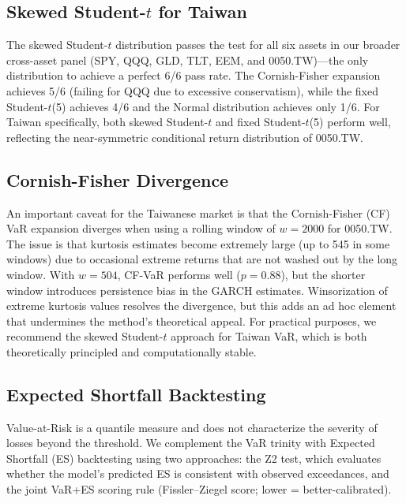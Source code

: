\subsection{Skewed Student-$t$ for Taiwan}

The skewed Student-$t$ distribution passes the \citet{kupiec1995} test for all six assets in our broader cross-asset panel (SPY, QQQ, GLD, TLT, EEM, and 0050.TW)---the only distribution to achieve a perfect 6/6 pass rate. The Cornish-Fisher expansion achieves 5/6 (failing for QQQ due to excessive conservatism), while the fixed Student-$t$(5) achieves 4/6 and the Normal distribution achieves only 1/6. For Taiwan specifically, both skewed Student-$t$ and fixed Student-$t$(5) perform well, reflecting the near-symmetric conditional return distribution of 0050.TW.

\subsection{Cornish-Fisher Divergence}
\label{sec:cf}

An important caveat for the Taiwanese market is that the Cornish-Fisher (CF) VaR expansion diverges when using a rolling window of $w = 2000$ for 0050.TW. The issue is that kurtosis estimates become extremely large (up to 545 in some windows) due to occasional extreme returns that are not washed out by the long window. With $w = 504$, CF-VaR performs well ($p = 0.88$), but the shorter window introduces persistence bias in the GARCH estimates. Winsorization of extreme kurtosis values resolves the divergence, but this adds an ad hoc element that undermines the method's theoretical appeal. For practical purposes, we recommend the skewed Student-$t$ approach for Taiwan VaR, which is both theoretically principled and computationally stable.


\subsection{Expected Shortfall Backtesting}
\label{sec:es}

Value-at-Risk is a quantile measure and does not characterize the severity of losses beyond the threshold. We complement the VaR trinity with Expected Shortfall (ES) backtesting using two approaches: the \citet{acerbi2014} Z2 test, which evaluates whether the model's predicted ES is consistent with observed exceedances, and the \citet{fissler2016} joint VaR+ES scoring rule (Fissler--Ziegel score; lower = better-calibrated).

